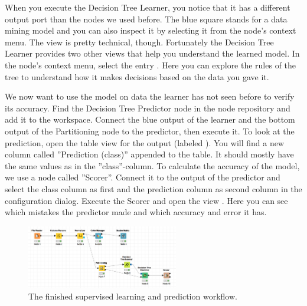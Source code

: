 When you execute the Decision Tree Learner, you notice that it has a different output port than the nodes we used before. The blue square stands for a data mining model and you can also inspect it by selecting it from the node's context menu. The view is pretty technical, though. Fortunately the Decision Tree Learner provides two other views that help you understand the learned model. In the node's context menu, select the entry . Here you can explore the rules of the tree to understand how it makes decisions based on the data you gave it.


We now want to use the model on data the learner has not seen before to verify its accuracy. Find the Decision Tree Predictor node in the node repository and add it to the workspace. Connect the blue output of the learner and the bottom output of the Partitioning node to the predictor, then execute it. To look at the prediction, open the table view for the output (labeled ). You will find a new column called ''Prediction (class)'' appended to the table. It should mostly have the same values as in the ''class''-column. To calculate the accuracy of the model, we use a node called ''Scorer''. Connect it to the output of the predictor and select the class column as first and the prediction column as second column in the configuration dialog. Execute the Scorer and open the view . Here you can see which mistakes the predictor made and which accuracy and error it has.


\begin{figure}
\centering
\includegraphics[width=0.59\textwidth]{graphics/knime_basics/workflow}
\caption{The finished supervised learning and prediction workflow.}
\label{fig:workflow}
\end{figure}

